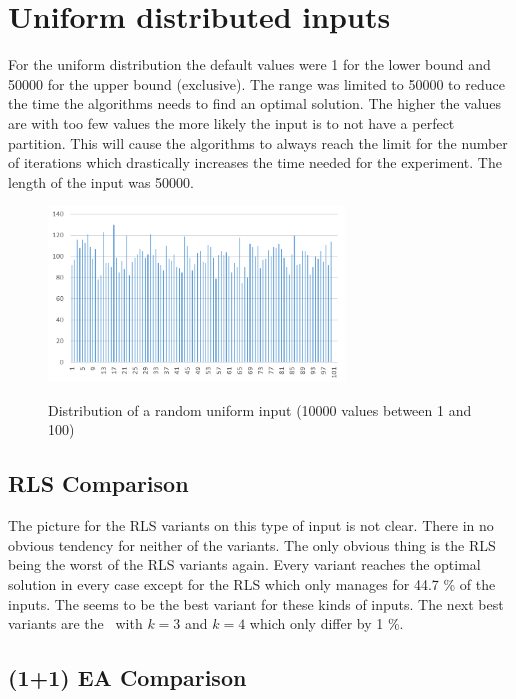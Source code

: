 \section{Uniform distributed inputs}
For the uniform distribution the default values were 1 for the lower bound and 50000 for the upper bound (exclusive).
The range was limited to 50000 to reduce the time the algorithms needs to find an optimal solution.
The higher the values are with too few values the more likely the input is to not have a perfect partition\cite{borgs2001phase}.
This will cause the algorithms to always reach the limit for the number of iterations which drastically increases the time needed for the experiment.
The length of the input was 50000.


\begin{figure}[h]
      \caption{Distribution of a random uniform input (10000 values between 1 and 100)}
      \centering
      \includegraphics[width=0.7\textwidth]{figures/images/numberGenerator/uniformDistributionMin1Max101n10000.png}\label{fig:uniDistExample}
\end{figure}
\subsection{RLS Comparison}


The picture for the RLS variants on this type of input is not clear.
There in no obvious tendency for neither of the variants.
The only obvious thing is the RLS being the worst of the RLS variants again.
Every variant reaches the optimal solution in every case except for the RLS which only manages for 44.7 \% of the inputs.
The \RLSN[2] seems to be the best variant for these kinds of inputs.
The next best variants are the \RLSR~with $k=3$ and $k=4$ which only differ by 1 \%.

\subsection{(1+1) EA Comparison}


